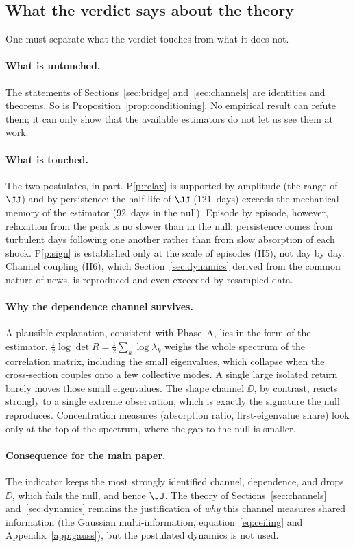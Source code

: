 \subsection{What the verdict says about the theory}

One must separate what the verdict touches from what it does not.

\paragraph{What is untouched.} The statements of Sections~\ref{sec:bridge}
and~\ref{sec:channels} are identities and theorems. So is
Proposition~\ref{prop:conditioning}. No empirical result can refute them; it can
only show that the available estimators do not let us see them at work.

\paragraph{What is touched.} The two postulates, in part. P\ref{p:relax} is
supported by amplitude (the range of $\JJ$) and by persistence: the half-life of
$\JJ$ ($121$~days) exceeds the mechanical memory of the estimator ($92$~days in
the null). Episode by episode, however, relaxation from the peak is no slower
than in the null: persistence comes from turbulent days following one another
rather than from slow absorption of each shock. P\ref{p:sign} is established
only at the scale of episodes (H5), not day by day. Channel coupling (H6), which Section~\ref{sec:dynamics}
derived from the common nature of news, is reproduced and even exceeded by
resampled data.

\paragraph{Why the dependence channel survives.} A plausible explanation,
consistent with Phase~A, lies in the form of the estimator.
$\tfrac12\log\det R=\tfrac12\sum_k\log\lambda_k$ weighs the whole spectrum of the
correlation matrix, including the small eigenvalues, which collapse when the
cross-section couples onto a few collective modes. A single large isolated return
barely moves those small eigenvalues. The shape channel $\DD$, by contrast,
reacts strongly to a single extreme observation, which is exactly the signature
the null reproduces. Concentration measures (absorption ratio, first-eigenvalue
share) look only at the top of the spectrum, where the gap to the null is
smaller.

\paragraph{Consequence for the main paper.} The indicator keeps the most
strongly identified channel, dependence, and drops $\DD$, which fails the null,
and hence $\JJ$. The theory of
Sections~\ref{sec:channels} and~\ref{sec:dynamics} remains the justification of
\emph{why} this channel measures shared information (the Gaussian
multi-information, equation~\eqref{eq:ceiling} and Appendix~\ref{app:gauss}),
but the postulated dynamics is not used.
